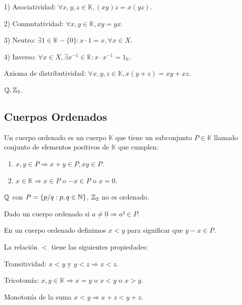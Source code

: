 1) Asociatividad: $\forall x,y,z \in \mathbb{K}, (xy)z=x(yz)$.

2) Conmutatividad: $\forall x,y \in \mathbb{K}, xy=yx$.

3) Neutro: $\exists 1 \in \mathbb{K}-\{0\} :x \cdot 1 = x, \forall x \in X$.

4) Inverso: $\forall x \in X, \exists x^{-1} \in \mathbb{K} : x \cdot x^{-1} = 1_\mathbb{K}$.

Axioma de distributividad: $\forall x,y,z \in \mathbb{K}, x(y+z)=xy+xz$.

\begin{eg}
    $\mathbb{Q}, \mathbb{Z}_2$.
\end{eg}

\subsection{Cuerpos Ordenados}

Un cuerpo ordenado es un cuerpo $\mathbb{K}$ que tiene un subconjunto $P \in \mathbb{K}$ llamado conjunto de elementos positivos de $\mathbb{K}$ que cumplen:
\begin{enumerate}
    \item $x,y \in P \Rightarrow x+y \in P, xy \in P$.
    \item $x \in \mathbb{K} \Rightarrow x \in P$ o $-x \in P$ o $x=0$.
\end{enumerate}

\begin{eg}
    $\mathbb{Q}$ con $P = \{ p/q:p,q\in \mathbb{N} \}$, $\mathbb{Z}_2$ no es ordenado.
\end{eg}

\begin{prop}
    Dado un cuerpo ordenado si $a \neq 0 \Rightarrow a²\in P$.
\end{prop}

En un cuerpo ordenado definimos $x<y$ para significar que $y-x\in P$.

La relación $<$ tiene las siguientes propiedades:

\begin{prop}
    Transitividad: $x<y$ y $y<z \Rightarrow x<z$.
\end{prop}

\begin{prop}
    Tricotomía: $x,y \in \mathbb{K} \Rightarrow x=y$ o $x<y$ o $x>y$.
\end{prop}

\begin{prop}
    Monotonía de la suma $x<y \Rightarrow x+z<y+z$.
\end{prop}


